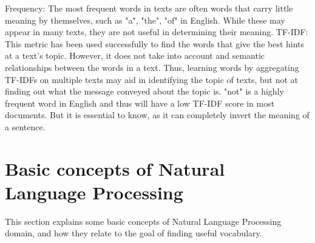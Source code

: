 Frequency: The most frequent words in texts are often words that carry little meaning by themselves, such as "a", "the", "of" in English.
While these may appear in many texts, they are not useful in determining their meaning.
TF-IDF: This metric has been used successfully to find the words that give the best hints at a text's topic.
However, it does not take into account and semantic relationships between the words in a text.
Thus, learning words by aggregating TF-IDFs on multiple texts may aid in identifying the topic of texts, but not at finding out what the message conveyed about the topic is.
"not" is a highly frequent word in English and thus will have a low TF-IDF score in most documents. But it is essential to know, as it can completely invert the meaning of a sentence.

\section{Basic concepts of Natural Language Processing}
This section explains some basic concepts of Natural Language Processing domain, and how they relate to the goal of finding useful vocabulary.

